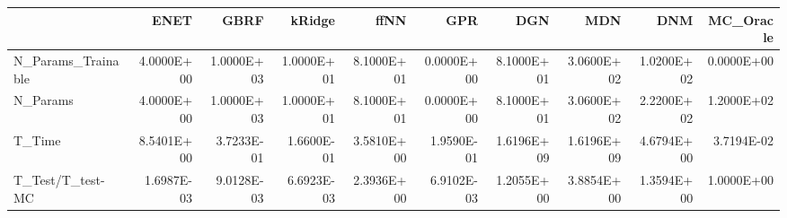 \begin{tabular}{lrrrrrrrrr}
\toprule
{} &       ENET &       GBRF &     kRidge &       ffNN &        GPR &        DGN &        MDN &        DNM &  MC\_Oracle \\
\midrule
N\_Params\_Trainable & 4.0000E+00 & 1.0000E+03 & 1.0000E+01 & 8.1000E+01 & 0.0000E+00 & 8.1000E+01 & 3.0600E+02 & 1.0200E+02 & 0.0000E+00 \\
N\_Params           & 4.0000E+00 & 1.0000E+03 & 1.0000E+01 & 8.1000E+01 & 0.0000E+00 & 8.1000E+01 & 3.0600E+02 & 2.2200E+02 & 1.2000E+02 \\
T\_Time             & 8.5401E+00 & 3.7233E-01 & 1.6600E-01 & 3.5810E+00 & 1.9590E-01 & 1.6196E+09 & 1.6196E+09 & 4.6794E+00 & 3.7194E-02 \\
T\_Test/T\_test-MC   & 1.6987E-03 & 9.0128E-03 & 6.6923E-03 & 2.3936E+00 & 6.9102E-03 & 1.2055E+00 & 3.8854E+00 & 1.3594E+00 & 1.0000E+00 \\
\bottomrule
\end{tabular}
